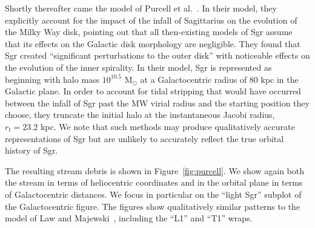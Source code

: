Shortly thereafter came the model of Purcell et
al.~\cite{purcell_sagittarius_2011}. In their model, they explicitly account
for the impact of the infall of Sagittarius on the evolution of the Milky Way
disk, pointing out that all then-existing models of Sgr assume that its
effects on the Galactic disk morphology are negligible. They found that Sgr
created ``significant perturbations to the outer disk'' with noticeable
effects on the evolution of the inner spirality. In their model, Sgr is
represented as beginning with halo mass \(10^{10.5}\) M\(_\odot\) at a
Galactocentric radius of 80 kpc in the Galactic plane. In order to account for
tidal stripping that would have occurred between the infall of Sgr past the MW
virial radius and the starting position they choose, they truncate the initial
halo at the instantaneous Jacobi radius, \(r_t = 23.2\) kpc. We note that such
methods may produce qualitatively accurate representations of Sgr but are
unlikely to accurately reflect the true orbital history of Sgr.

The resulting stream debris is shown in Figure~\ref{fig:purcell}. We show again
both the stream in terms of heliocentric coordinates and in the orbital plane in
terms of Galactocentric distances. We focus in particular on the ``light Sgr''
subplot of the Galactocentric figure. The figures show qualitatively similar
patterns to the model of Law and Majewski~\cite{law_sagittarius_2010}, including
the ``L1'' and ``T1'' wraps.

